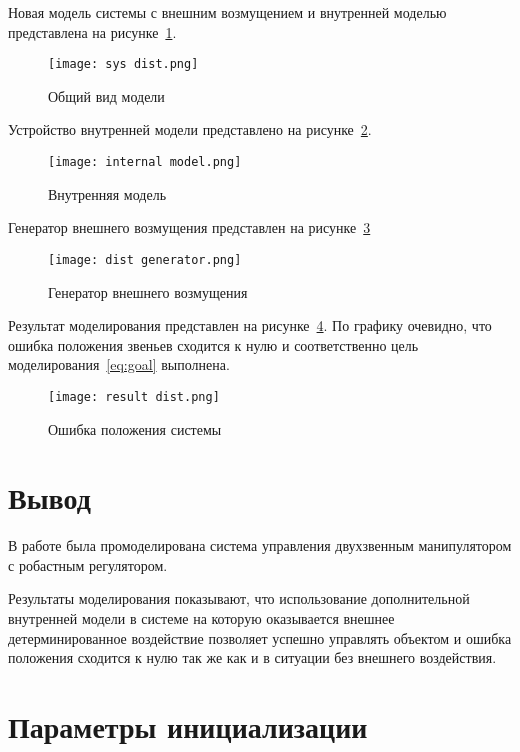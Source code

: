 \documentclass[14pt]{extarticle}
\begin{document}
    Новая модель системы с внешним возмущением и внутренней моделью представлена на рисунке~\ref{pic:sys dist}.
    \begin{figure}[H]
        \centering
        \texttt{[image: sys dist.png]}
        \caption{Общий вид модели}
        \label{pic:sys dist}
    \end{figure}

    Устройство внутренней модели представлено на рисунке~\ref{pic:internal model}.
    \begin{figure}[H]
        \centering
        \texttt{[image: internal model.png]}
        \caption{Внутренняя модель}
        \label{pic:internal model}
    \end{figure}

    Генератор внешнего возмущения представлен на рисунке~\ref{pic:dist generator}
    \begin{figure}[H]
        \centering
        \texttt{[image: dist generator.png]}
        \caption{Генератор внешнего возмущения}
        \label{pic:dist generator}
    \end{figure}

    Результат моделирования представлен на рисунке~\ref{pic:result dist}. По графику очевидно, что ошибка
    положения звеньев сходится к нулю и соответственно цель моделирования~\eqref{eq:goal} выполнена.
    \begin{figure}[H]
        \centering
        \texttt{[image: result dist.png]}
        \caption{Ошибка положения системы}
        \label{pic:result dist}
    \end{figure}

    \section*{Вывод}
    В работе была промоделирована система управления двухзвенным манипулятором с робастным регулятором.

    Результаты моделирования показывают, что использование дополнительной внутренней модели в системе
    на которую оказывается внешнее детерминированное воздействие позволяет успешно управлять объектом
    и ошибка положения сходится к нулю так же как и в ситуации без внешнего воздействия.

    \appendix \newpage
    \renewcommand{\thesection}{Приложение \Asbuk{section}}
    \section{Параметры инициализации}\label{code:given}
\end{document}

